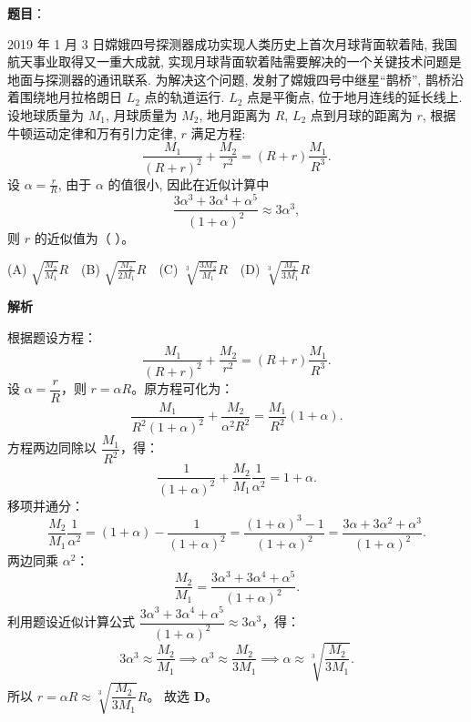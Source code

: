 \begin{answer}

\textbf{题目}：

2019 年 1 月 3 日嫦娥四号探测器成功实现人类历史上首次月球背面软着陆, 我国航天事业取得又一重大成就, 实现月球背面软着陆需要解决的一个关键技术问题是地面与探测器的通讯联系. 为解决这个问题, 发射了嫦娥四号中继星“鹊桥”, 鹊桥沿着围绕地月拉格朗日 $L_2$ 点的轨道运行. $L_2$ 点是平衡点, 位于地月连线的延长线上. 设地球质量为 $M_1$, 月球质量为 $M_2$, 地月距离为 $R$, $L_2$ 点到月球的距离为 $r$, 根据牛顿运动定律和万有引力定律, $r$ 满足方程:
\nopagebreak[4]
\[
\frac{M_1}{(R+r)^2} + \frac{M_2}{r^2} = (R+r)\frac{M_1}{R^3}.
\]
设 $\alpha = \frac{r}{R}$, 由于 $\alpha$ 的值很小, 因此在近似计算中
\nopagebreak[4]
\[
\frac{3\alpha^3 + 3\alpha^4 + \alpha^5}{(1+\alpha)^2} \approx 3\alpha^3,
\]
则 $r$ 的近似值为（ ）。

(A) $\sqrt{\frac{M_2}{M_1}} R$　(B) $\sqrt{\frac{M_2}{2M_1}} R$　(C) $\sqrt[3]{\frac{3M_2}{M_1}} R$　(D) $\sqrt[3]{\frac{M_2}{3M_1}} R$

\textbf{解析}

根据题设方程：
\nopagebreak[4]
\[\frac{M_1}{(R+r)^2} + \frac{M_2}{r^2} = (R+r)\frac{M_1}{R^3}.\]
设 $\alpha = \dfrac{r}{R}$，则 $r = \alpha R$。原方程可化为：
\nopagebreak[4]
\[\frac{M_1}{R^2 (1+\alpha)^2} + \frac{M_2}{\alpha^2 R^2} = \frac{M_1}{R^2}(1+\alpha).\]
方程两边同除以 $\dfrac{M_1}{R^2}$，得：
\nopagebreak[4]
\[\frac{1}{(1+\alpha)^2} + \frac{M_2}{M_1}\frac{1}{\alpha^2} = 1 + \alpha.\]
移项并通分：
\nopagebreak[4]
\[\frac{M_2}{M_1}\frac{1}{\alpha^2} = (1+\alpha) - \frac{1}{(1+\alpha)^2} = \frac{(1+\alpha)^3 - 1}{(1+\alpha)^2} = \frac{3\alpha + 3\alpha^2 + \alpha^3}{(1+\alpha)^2}.\]
两边同乘 $\alpha^2$：
\nopagebreak[4]
\[\frac{M_2}{M_1} = \frac{3\alpha^3 + 3\alpha^4 + \alpha^5}{(1+\alpha)^2}.\]
利用题设近似计算公式 $\dfrac{3\alpha^3 + 3\alpha^4 + \alpha^5}{(1+\alpha)^2} \approx 3\alpha^3$，得：
\nopagebreak[4]
\[3\alpha^3 \approx \frac{M_2}{M_1} \implies \alpha^3 \approx \frac{M_2}{3M_1} \implies \alpha \approx \sqrt[3]{\frac{M_2}{3M_1}}.\]
所以 $r = \alpha R \approx \sqrt[3]{\dfrac{M_2}{3M_1}} R$。
故选 \textbf{D}。


\end{answer}
